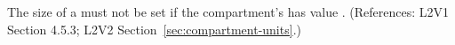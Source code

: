 The size of a \Compartment must not be set if the compartment's
  has value . (References: L2V1
Section 4.5.3; L2V2 Section~\ref{sec:compartment-units}.)
